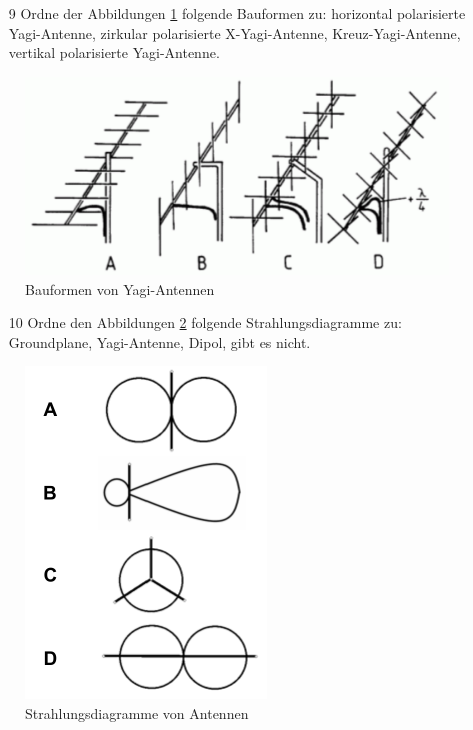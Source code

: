 \begin{enumerate} 
\itemsep1pt\parskip0pt
\item[9] Ordne der Abbildungen \ref{yagi} folgende Bauformen zu: horizontal polarisierte Yagi-Antenne, zirkular polarisierte X-Yagi-Antenne, Kreuz-Yagi-Antenne, vertikal polarisierte Yagi-Antenne.
\end{enumerate}

\begin{figure}[H]
	\centering
	\includegraphics[scale=0.5]{Antennen/Bilder/TH209.pdf}
	\caption{Bauformen von Yagi-Antennen}
	\label{yagi}
\end{figure}
\begin{enumerate} 
\itemsep1pt\parskip0pt
\item[10] Ordne den Abbildungen \ref{strahlungsdiagramm} folgende Strahlungsdiagramme zu: Groundplane, Yagi-Antenne, Dipol, gibt es nicht.
\end{enumerate}

\begin{figure}[H]
	\centering
	\includegraphics[scale=0.8]{Antennen/Bilder/Strahlungsdiagramm.pdf}
	\caption{Strahlungsdiagramme von Antennen}
	\label{strahlungsdiagramm}
\end{figure}
